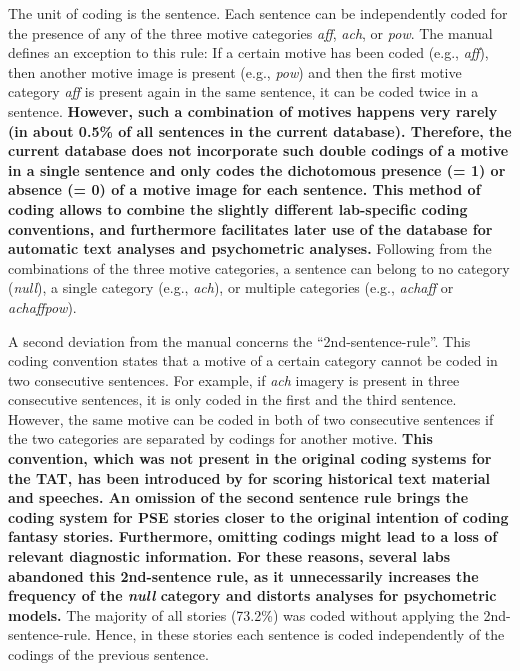 \documentclass[man,a4paper,mask]{apa6}\usepackage[]{graphicx}\usepackage[]{color}
\newcommand{\added}[1]{\textcolor{colour_added}{\bf{#1}}}
\begin{document}
The unit of coding is the sentence. Each sentence can be independently coded for the presence of any of the three motive categories \emph{aff}, \emph{ach}, or \emph{pow}. The manual defines an exception to this rule: If a certain motive has been coded (e.g., \emph{aff}), then another motive image is present (e.g., \emph{pow}) and then the first motive category \emph{aff} is present again in the same sentence, it can be coded twice in a sentence. \added{However, such a combination of motives happens very rarely (in about 0.5\% of all sentences in the current database). Therefore, the current database does not incorporate such double codings of a motive in a single sentence and only codes the dichotomous presence (= 1) or absence (= 0) of a motive image for each sentence. This method of coding allows to combine the slightly different lab-specific coding conventions, and furthermore facilitates later use of the database for automatic text analyses and psychometric analyses.} 
Following from the combinations of the three motive categories, a sentence can belong to no category (\emph{null}), a single category (e.g., \emph{ach}), or multiple categories (e.g., \emph{achaff} or \emph{achaffpow}).

A second deviation from the manual concerns the ``2nd-sentence-rule''. This coding convention states that a motive of a certain category cannot be coded in two consecutive sentences. For example, if \emph{ach} imagery is present in three consecutive sentences, it is only coded in the first and the third sentence. However, the same motive can be coded in both of two consecutive sentences if the two categories are separated by codings for another motive. 
\added{This convention, which was not present in the original coding systems for the TAT, has been introduced by \textcite{winter_ManualScoringMotive_1994} for scoring historical text material and speeches. An omission of the second sentence rule brings the coding system for PSE stories closer to the original intention of coding fantasy stories. Furthermore, omitting codings might lead to a loss of relevant diagnostic information. For these reasons, several labs abandoned this 2nd-sentence rule, as it unnecessarily increases the frequency of the \emph{null} category and distorts analyses for psychometric models.} The majority of all stories (73.2\%) was coded without applying the 2nd-sentence-rule. Hence, in these stories each sentence is coded independently of the codings of the previous sentence.
\end{document}
